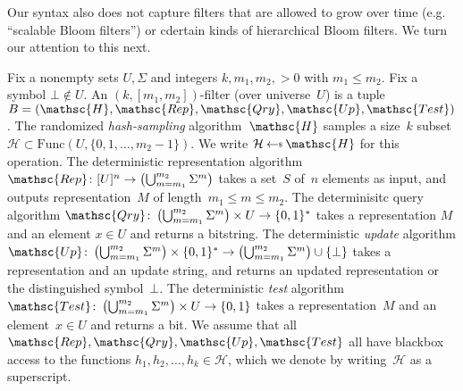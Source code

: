 Our syntax also does not capture filters that are allowed to grow over time (e.g. ``scalable Bloom filters'') or cdertain kinds of hierarchical Bloom filters.  We turn our attention to this next.


Fix a nonempty sets $U,\Sigma$ and integers $k,m_1,m_2,>0$ with $m_1 \leq m_2$.  Fix a symbol $\bot \not\in U$.  An $(k,[m_1,m_2])$-filter (over universe~$U$) is a tuple  $B=(\mathsc{H},\mathsc{Rep},\mathsc{Qry},\mathsc{Up}, \mathsc{Test})$.   
%
The randomized \emph{hash-sampling} algorithm~$\mathsc{H}$ samples a size~$k$ subset~$\mathcal{H} \subset \mathrm{Func}(U,\{0,1,\ldots,m_2-1\})$.  We write $\mathcal{H} \getsr \mathsc{H}$ for this operation.
%
The deterministic representation algorithm $\mathsc{Rep}\colon [U]^n \rightarrow \left(\bigcup_{m=m_1}^{m_2}\Sigma^m\right)$ takes a set~$S$ of~$n$ elements as input, and outputs representation~$M$ of length~$m_1 \leq m \leq m_2$.
%
The determinisitc query algorithm $\mathsc{Qry}\colon \left(\bigcup_{m=m_1}^{m_2}\Sigma^m \right)\times U \rightarrow \bits^*$ takes a representation $M$ and an element $x \in U$ and returns a bitstring.  
%
The deterministic \emph{update} algorithm $\mathsc{Up}\colon \left(\bigcup_{m=m_1}^{m_2}\Sigma^m \right)\times \bits^* \rightarrow \left(\bigcup_{m=m_1}^{m_2}\Sigma^m \right) \cup \{\bot\}$ takes a representation and an update string, and returns an updated representation or the distinguished symbol~$\bot$. 
%
The deterministic \emph{test} algorithm $\mathsc{Test} \colon \left(\bigcup_{m=m_1}^{m_2}\Sigma^m \right) \times U \rightarrow \bits$ takes a representation~$M$ and an element~$x \in U$ and returns a bit.
%
We assume that all $\mathsc{Rep},\mathsc{Qry},\mathsc{Up},\mathsc{Test}$ all have blackbox access to the functions $h_1,h_2,\ldots,h_k \in \mathcal{H}$, which we denote by writing~$\mathcal{H}$ as a superscript.   





